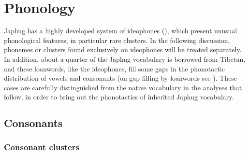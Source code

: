 \chapter{Phonology}

  

 Japhug has a highly  developed system of ideophones (\citealt{japhug14ideophones}), which present unusual phonological features, in particular rare clusters. In the following discussion, phonemes or clusters found exclusively on  ideophones will be treated separately. In addition, about a quarter of the Japhug vocabulary is borrowed from Tibetan, and these loanwords, like the ideophones, fill some gaps in the phonotactic distribution of vowels and consonants (on gap-filling by loanwords see \citealt[63-64]{martinet05economie}).  These cases are carefully distinguished from the native vocabulary in the analyses that follow, in order to bring out the phonotactics of inherited Japhug vocabulary.


\section{Consonants}

\subsection{Consonant clusters}


